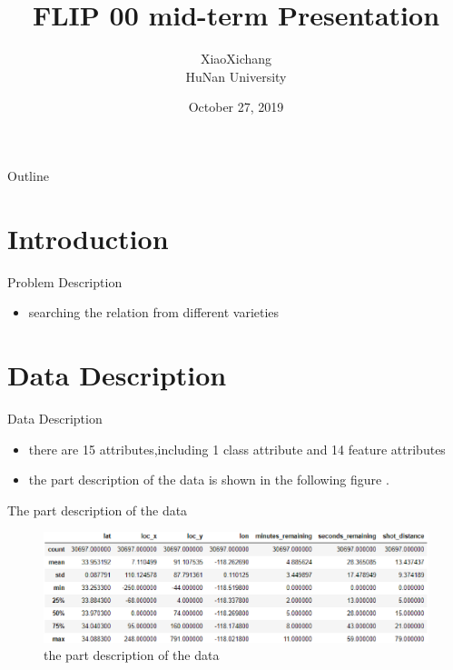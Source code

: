 \documentclass[
 size=14pt,
 paper=smartboard, %
 mode=present, %
 display=slides, %
style=tuliplab,
pauseslide,
fleqn,leqno]{powerdot}
\title{FLIP 00 mid-term Presentation}
\author{
XiaoXichang
\\
HuNan University 
}
\date{October 27, 2019}
\begin{document}
\maketitle 

\begin{slide}[toc=,bm=]{Outline}
\tableofcontents[content=sections]
\end{slide}

\section{Introduction}

\begin{slide}{Problem Description}
  \begin{itemize}
    \item  searching the relation from different varieties 
  \end{itemize}
\end{slide}


\section{Data Description}


\begin{slide}{Data Description}
\begin{itemize}
\item there are 15 attributes,including 1 class attribute and 14 feature attributes
\item the part description of the data is shown in the following figure .
\end{itemize}
\end{slide}

\begin{slide}{The part description of the data}
	\vspace*{10pt}
	\begin{figure}[htbp]
		\centering
		\includegraphics[scale=0.4]{1.eps}
		\caption{the part description of the data}
	\end{figure}
\end{slide}
\end{document}

